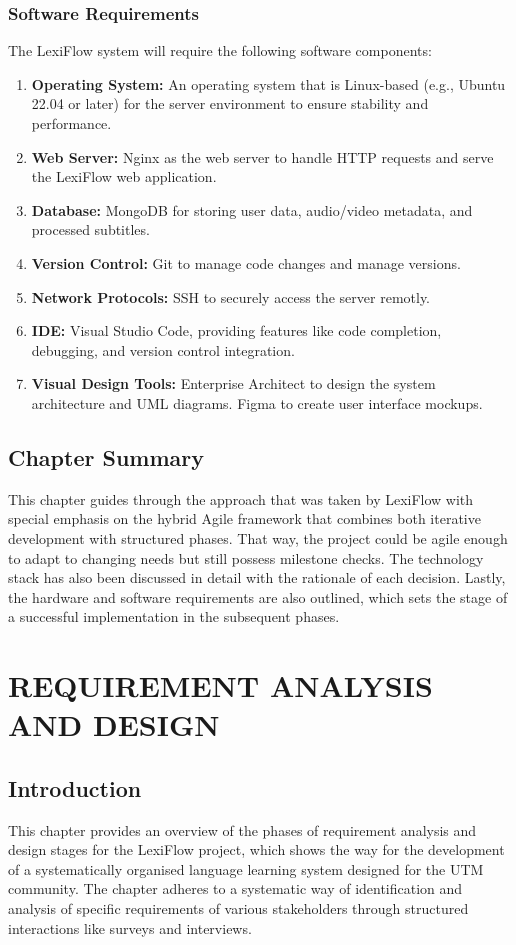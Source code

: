 \documentclass[oneside]{utmthesis}
\begin{document}
\subsection{Software Requirements}
The LexiFlow system will require the following software components:
\begin{enumerate}[label= (\alph*)]
    \item \textbf{Operating System:} An operating system that is Linux-based (e.g., Ubuntu 22.04 or later) for the server environment to ensure stability and performance.
    \item \textbf{Web Server:} Nginx as the web server to handle HTTP requests and serve the LexiFlow web application.
    \item \textbf{Database:} MongoDB for storing user data, audio/video metadata, and processed subtitles.
    \item \textbf{Version Control:} Git to manage code changes and manage versions.
    \item \textbf{Network Protocols:} SSH to securely access the server remotly.
    \item \textbf{IDE:} Visual Studio Code, providing features like code completion, debugging, and version control integration.
    \item \textbf{Visual Design Tools:} Enterprise Architect to design the system architecture and UML diagrams. Figma to create user interface mockups.
\end{enumerate}



\section{Chapter Summary}
This chapter guides through the approach that was taken by LexiFlow with special emphasis on the hybrid Agile framework that combines both iterative development with structured phases. That way, the project could be agile enough to adapt to changing needs but still possess milestone checks. The technology stack has also been discussed in detail with the rationale of each decision. Lastly, the hardware and software requirements are also outlined, which sets the stage of a successful implementation in the subsequent phases.

\chapter{REQUIREMENT ANALYSIS AND DESIGN}
\section{Introduction}
This chapter provides an overview of the phases of requirement analysis and design stages for the LexiFlow project, which shows the way for the development of a systematically organised language learning system designed for the UTM community. The chapter adheres to a systematic way of identification and analysis of specific requirements of various stakeholders through structured interactions like surveys and interviews.
\end{document}
